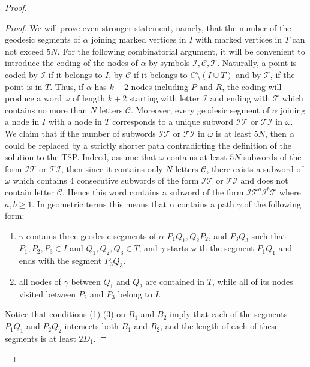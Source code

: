 \begin{proof}
\begin{proof}
  We will prove even stronger statement, namely, that the number of the geodesic segments of $\alpha$ joining marked vertices in $I$ with marked vertices in $T$ can not exceed $5N$.  For the following combinatorial argument, it will be convenient to introduce the coding of the nodes of $\alpha$ by symbols $\mathcal{I},\mathcal{C},\mathcal{T}$. Naturally, a point is coded by $\mathcal{I}$ if it belongs to $I$, by $\mathcal{C}$ if it belongs to $C \setminus(I \cup T)$ and by $\mathcal{T}$, if the point is in $T$. Thus, if $\alpha$ has $k+2$ nodes including $P$ and $R$, the coding will produce a word $ \omega$ of length $k+2$ starting with letter $\mathcal{I}$ and ending with $\mathcal{T}$ which contains no more than $N$ letters $\mathcal{C}$.  Moreover, every geodesic segment of $\alpha$ joining a node in $I$ with a node in $T$ corresponds to a unique subword $\mathcal{IT}$ or $\mathcal{TI}$ in $\omega$. We claim that if the number of subwords $\mathcal{IT}$ or $\mathcal{TI}$ in $\omega$ is at least $5N$, then $\alpha$ could be replaced by a strictly shorter path contradicting the definition of the solution to the TSP. Indeed, assume that $\omega$  contains at least $5N$ subwords of the form $\mathcal{IT}$ or $\mathcal{TI}$, then since it contains only $N$ letters $\mathcal{C}$, there exists a subword of $\omega$ which contains $4$ consecutive subwords of the form $\mathcal{IT}$ or $\mathcal{TI}$ and does not contain letter $\mathcal{C}$. Hence this word contains a subword of the form  $\mathcal{I}\mathcal{T}^a\mathcal{I}^b\mathcal{T}$ where $a,b \geq 1$. In geometric terms this means that $\alpha$ contains a path $\gamma$ of the following form: 
  \begin{enumerate}
      \item $\gamma$ contains three geodesic segments of $\alpha$ $P_1Q_1, Q_2P_2$, and $P_3Q_3$ such that $P_1, P_2, P_3 \in I$ and $Q_1,Q_2, Q_3 \in T$, and $\gamma$ starts with the segment $P_1Q_1$ and ends with the segment $P_3Q_3$.
      \item all nodes of $\gamma$ between $Q_1$ and $Q_2$ are contained in $T$, while all of its nodes visited  between $P_2$ and $P_3$ belong to $I$.
  \end{enumerate}

Notice that conditions (1)-(3) on $B_1$ and $B_2$ imply that each of the segments $P_1Q_1$ and $P_2Q_2$ intersects both $B_1$ and $B_2$, and the length of each of these segments is at least $2D_1$.  


\end{proof}
\end{proof}
